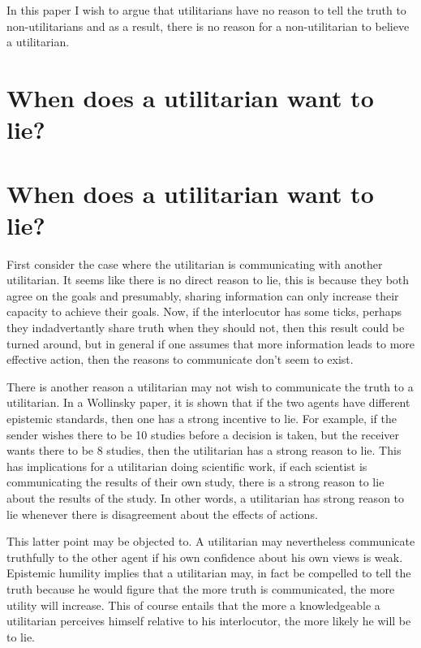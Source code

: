 \documentclass[11pt]{article}
\numberwithin{equation}{section}
\begin{document}
In this paper I wish to argue that utilitarians have no reason to tell the truth to non-utilitarians and as a result, there is no reason for a non-utilitarian to believe a utilitarian. 



\section{When does a utilitarian want to lie?}



\section{When does a utilitarian want to lie?}




First consider the case where the utilitarian is communicating with another utilitarian. It seems like there is no direct reason to lie, this is because they both agree on the goals and presumably, sharing information can only increase their capacity to achieve their goals. Now, if the interlocutor has some ticks, perhaps they indadvertantly share truth when they should not, then this result could be turned around, but in general if one assumes that more information leads to more effective action, then the reasons to communicate don't seem to exist. 

There is another reason a utilitarian may not wish to communicate the truth to a utilitarian. In a Wollinsky paper, it is shown that if the two agents have different epistemic standards, then one has a strong incentive to lie. For example, if the sender wishes there to be 10 studies before a decision is taken, but the receiver wants there to be 8 studies, then the utilitarian has a strong reason to lie. This has implications for a utilitarian doing scientific work, if each scientist is communicating the results of their own study, there is a strong reason to lie about the results of the study. In other words, a utilitarian has strong reason to lie whenever there is disagreement about the effects of actions. 

This latter point may be objected to. A utilitarian may nevertheless communicate truthfully to the other agent if his own confidence about his own views is weak. Epistemic humility implies that a utilitarian may, in fact be compelled to tell the truth because he would figure that the more truth is communicated, the more utility will increase. This of course entails that the more a knowledgeable a utilitarian perceives himself relative to his interlocutor, the more likely he will be to lie. 
\end{document}

